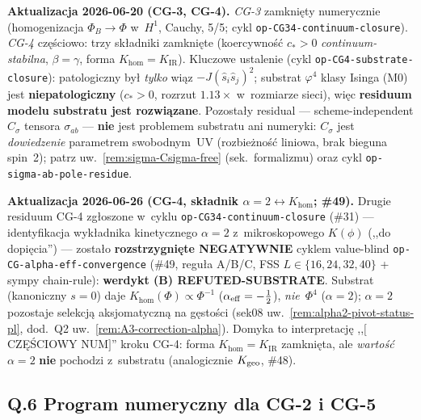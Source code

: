 \medskip\noindent
\textbf{Aktualizacja 2026-06-20 (CG-3, CG-4).}
\emph{CG-3} zamkni\k{e}ty numerycznie (homogenizacja $\Phi_B\to\Phi$
w~$H^1$, Cauchy, 5/5; cykl \texttt{op-CG34-continuum-closure}).
\emph{CG-4} cz\k{e}\'sciowo: trzy sk\l{}adniki zamkni\k{e}te
(koercywno\'s\'c $c_*>0$ \emph{continuum-stabilna}, $\beta=\gamma$,
forma $K_\mathrm{hom}=K_\mathrm{IR}$). Kluczowe ustalenie
(cykl \texttt{op-CG4-substrate-closure}): patologiczny by\l{}
\emph{tylko} wi\k{a}z $-J(\hat s_i\hat s_j)^2$; substrat
$\varphi^4$ klasy Isinga (M0) jest \textbf{niepatologiczny}
($c_*>0$, rozrzut $1.13\times$ w~rozmiarze sieci), wi\k{e}c
\textbf{residuum modelu substratu jest rozwi\k{a}zane}. Pozosta\l{}y
residual --- scheme-independent $C_\sigma$ tensora $\sigma_{ab}$ ---
\textbf{nie} jest problemem substratu ani numeryki: $C_\sigma$ jest
\emph{dowiedzenie} parametrem swobodnym~UV (rozbie\.zno\'s\'c liniowa,
brak bieguna spin~2); patrz uw.~\ref{rem:sigma-Csigma-free}
(sek.~formalizmu) oraz cykl
\texttt{op-sigma-ab-pole-residue}.

\medskip\noindent
\textbf{Aktualizacja 2026-06-26 (CG-4, sk\l{}adnik $\alpha=2\leftrightarrow K_\mathrm{hom}$; \#49).}
Drugie residuum CG-4 zg\l{}oszone w~cyklu \texttt{op-CG34-continuum-closure} (\#31) ---
identyfikacja wyk\l{}adnika kinetycznego $\alpha=2$ z~mikroskopowego $K(\phi)$ (,,do dopi\k{e}cia'')
--- zosta\l{}o \textbf{rozstrzygni\k{e}te NEGATYWNIE} cyklem value-blind
\texttt{op-CG-alpha-eff-convergence} (\#49, regu\l{}a A/B/C, FSS $L\in\{16,24,32,40\}$ +
sympy chain-rule): \textbf{werdykt (B) REFUTED-SUBSTRATE}. Substrat (kanoniczny $s=0$) daje
$K_\mathrm{hom}(\Phi)\propto\Phi^{-1}$ ($\alpha_{\rm eff}=-\tfrac12$), \emph{nie}~$\Phi^{4}$
($\alpha=2$); $\alpha=2$ pozostaje selekcj\k{a} aksjomatyczn\k{a} na g\k{e}sto\'sci
(sek08 uw.~\ref{rem:alpha2-pivot-status-pl}, dod.~Q2 uw.~\ref{rem:A3-correction-alpha}).
Domyka to interpretacj\k{e} ,,$[$CZ\k{E}\'SCIOWY NUM$]$'' kroku CG-4: forma $K_\mathrm{hom}=K_\mathrm{IR}$
zamkni\k{e}ta, ale \emph{warto\'s\'c}~$\alpha=2$ \textbf{nie} pochodzi z~substratu (analogicznie
$K_{\rm geo}$, \#48).

\subsection*{Q.6 Program numeryczny dla CG-2 i CG-5}

